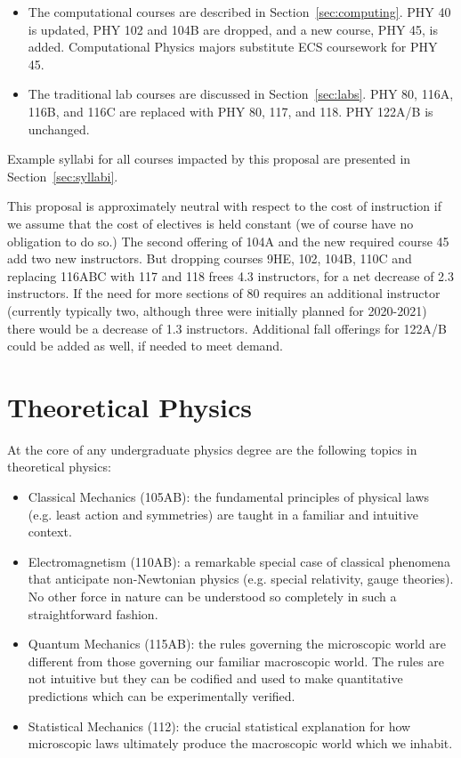 \documentclass[12pt]{article}
\begin{document}
\begin{itemize}
\item The computational courses are described in
  Section~\ref{sec:computing}. PHY 40 is updated, PHY 102 and 104B are
  dropped, and a new course, PHY 45, is added.
  Computational Physics majors substitute ECS coursework for PHY 45.

\item The traditional lab courses are discussed in
  Section~\ref{sec:labs}. PHY 80, 116A, 116B, and 116C are replaced with
  PHY 80, 117, and 118.  PHY 122A/B is unchanged.
  
\end{itemize}
Example syllabi for all courses impacted by this proposal are
presented in Section~\ref{sec:syllabi}.

This proposal is approximately neutral with respect to the cost of
instruction if we assume that the cost of electives is held constant
(we of course have no obligation to do so.)  The second offering of 104A and the
new required course 45 add two new instructors.  But dropping courses
9HE, 102, 104B, 110C and replacing 116ABC with 117 and 118 frees 4.3
instructors, for a net decrease of 2.3 instructors.  If the need for
more sections of 80 requires an additional instructor (currently
typically two, although three were initially planned for 2020-2021)
there would be a decrease of 1.3 instructors.  Additional fall
offerings for 122A/B could be added as well, if needed to meet demand.

\section{Theoretical Physics}
\label{sec:theory}

At the core of any undergraduate physics degree are the following
topics in theoretical physics:
\begin{itemize}
\item Classical Mechanics (105AB): the fundamental principles of physical laws
  (e.g. least action and symmetries) are taught in a familiar and
  intuitive context. 
\item Electromagnetism (110AB): a remarkable special case of classical
  phenomena that anticipate non-Newtonian physics (e.g. special
  relativity, gauge theories).  No other force in nature can be understood so
  completely in such a straightforward fashion.  
\item Quantum Mechanics (115AB): the rules governing the microscopic world are
  different from those governing our familiar macroscopic world.  The
  rules are not intuitive but they can be codified and used to make
  quantitative predictions which can be experimentally verified.
\item Statistical Mechanics (112): the crucial statistical explanation for how
  microscopic laws ultimately produce the macroscopic world which we inhabit.
\end{itemize}
\end{document}
